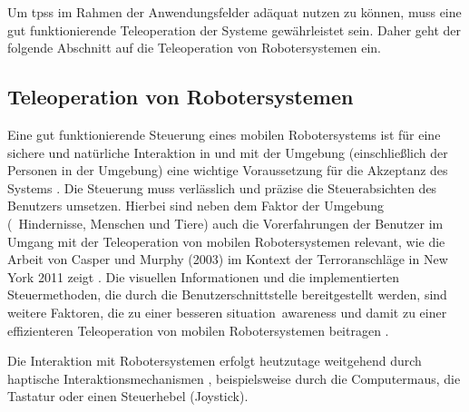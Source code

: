 Um \aclp{tps} im Rahmen der \og Anwendungsfelder adäquat nutzen zu können, muss eine gut funktionierende Teleoperation der Systeme gewährleistet sein. Daher geht der folgende Abschnitt auf die Teleoperation von Robotersystemen ein.

\subsection{Teleoperation von Robotersystemen}
\label{section:steuerung}

Eine gut funktionierende Steuerung eines mobilen Robotersystems ist für eine sichere und natürliche Interaktion in und mit der Umgebung (einschließlich der Personen in der Umgebung) eine wichtige Voraussetzung für die Akzeptanz des Systems \cite{Tsui2014}. Die Steuerung muss verlässlich und präzise die Steuerabsichten des Benutzers umsetzen. Hierbei sind neben dem Faktor der Umgebung (\zB~Hindernisse, Menschen und Tiere) auch die Vorerfahrungen der Benutzer im Umgang mit der Teleoperation von mobilen Robotersystemen relevant, wie die Arbeit von Casper und Murphy (2003) im Kontext der Terroranschläge in New York 2011 zeigt \cite{Casper2003,Labonte2010}.
Die visuellen Informationen und die implementierten Steuermethoden, die durch die Benutzerschnittstelle bereitgestellt werden, sind weitere Faktoren, die zu einer besseren situation~awareness und damit zu einer effizienteren Teleoperation von mobilen Robotersystemen beitragen \cite{Scholtz04,Yanco2004-2,Labonte2010,Tsui2014,Goodrich2013}.

Die Interaktion mit Robotersystemen erfolgt heutzutage weitgehend durch haptische Interaktionsmechanismen \cite{Dunser2015}, beispielsweise durch die Computermaus, die Tastatur oder einen Steuerhebel (Joystick). 

